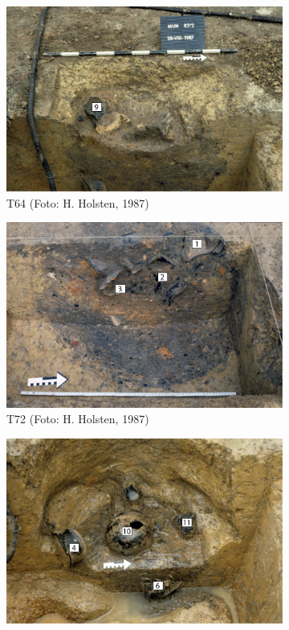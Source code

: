 \begin{figure}[p]
	\begin{subfigure}[t]{\columnwidth}
		\includegraphics[width = \textwidth]{fig/MUN87-213_T64_H87-06-11.pdf}
		\caption{T64 (Foto: H. Holsten, 1987)}
		\label{fig:MUN87-213_T64_H87-06-11}
	\end{subfigure}
	\begin{subfigure}[t]{\columnwidth}
		\includegraphics[width = \textwidth]{fig/MUN87-213_T72_H87-06-3.pdf}
		\caption{T72 (Foto: H. Holsten, 1987)}
		\label{fig:MUN87-213_T72_H87-06-3}
	\end{subfigure}\hfill
	\begin{subfigure}[t]{\columnwidth}
		\includegraphics[width = \textwidth]{fig/MUN87-213_T106_H87-06-15.pdf}

\end{subfigure}
\end{figure}
